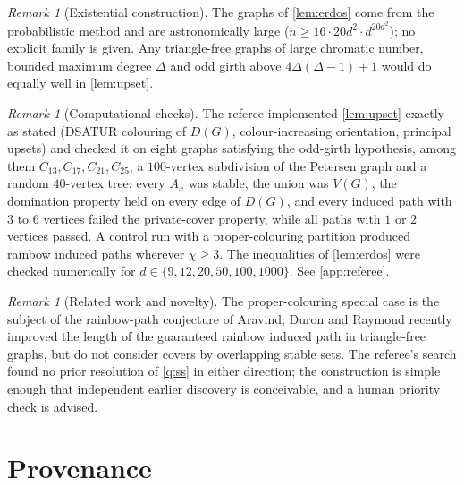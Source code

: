 \documentclass[11pt,a4paper]{article}
\theoremstyle{plain}
\theoremstyle{definition}
\theoremstyle{remark}
\newtheorem{remark}[theorem]{Remark}
\begin{document}
\begin{remark}[Existential construction]
The graphs of \cref{lem:erdos} come from the probabilistic method and are astronomically large ($n\ge16\cdot20d^2\cdot d^{20d^2}$); no explicit family is given. Any triangle-free graphs of large chromatic number, bounded maximum degree $\Delta$ and odd girth above $4\Delta(\Delta-1)+1$ would do equally well in \cref{lem:upset}.
\end{remark}

\begin{remark}[Computational checks]
The referee implemented \cref{lem:upset} exactly as stated (DSATUR colouring of $D(G)$, colour-increasing orientation, principal upsets) and checked it on eight graphs satisfying the odd-girth hypothesis, among them $C_{13},C_{17},C_{21},C_{25}$, a $100$-vertex subdivision of the Petersen graph and a random $40$-vertex tree: every $A_x$ was stable, the union was $V(G)$, the domination property held on every edge of $D(G)$, and every induced path with $3$ to $6$ vertices failed the private-cover property, while all paths with $1$ or $2$ vertices passed. A control run with a proper-colouring partition produced rainbow induced paths wherever $\chi\ge3$. The inequalities of \cref{lem:erdos} were checked numerically for $d\in\{9,12,20,50,100,1000\}$. See \cref{app:referee}.
\end{remark}

\begin{remark}[Related work and novelty]
The proper-colouring special case is the subject of the rainbow-path conjecture of Aravind; Duron and Raymond \cite{DR26} recently improved the length of the guaranteed rainbow induced path in triangle-free graphs, but do not consider covers by overlapping stable sets. The referee's search found no prior resolution of \cref{q:ss} in either direction; the construction is simple enough that independent earlier discovery is conceivable, and a human priority check is advised.
\end{remark}

\section{Provenance}\label{sec:provenance}
\end{document}
